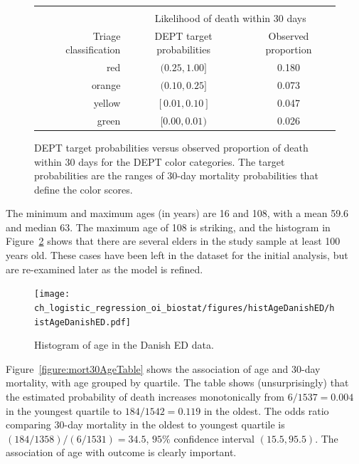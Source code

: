 \begin{figure}[ht]
\centering
\begin{tabular}{rcc}
  \hline \\
  & \multicolumn{2}{c}{Likelihood of death within 30 days} \\
Triage classification & DEPT target probabilities & Observed proportion  \\
  \hline
red & $(0.25, 1.00]$ & 0.180   \\
orange & $(0.10, 0.25]$ & 0.073   \\
yellow & $[0.01, 0.10]$ & 0.047   \\
green & $[0.00, 0.01)$ & 0.026   \\
   \hline
\end{tabular}
\caption{DEPT target probabilities  versus observed proportion of death within 30 days for the DEPT color categories. The target probabilities are the ranges of 30-day mortality probabilities that define the color scores.} 
\label{figure:predVsObsTriageMort30Table}
\end{figure}

The minimum and maximum ages (in years) are 16 and 108, with a mean 59.6 and median 63.  The maximum age of 108 is striking, and the histogram in Figure~\ref{figure:histAgeDanishED} shows that there are several elders in the study sample at least 100  years old.  These cases have been left in the dataset for the initial analysis, but are re-examined later as the model is refined.

\begin{figure}[!tbh]
  \centering
  \texttt{[image: ch\_logistic\_regression\_oi\_biostat/figures/histAgeDanishED/histAgeDanishED.pdf]}
    \caption{Histogram of age in the Danish ED data.}
    \label{figure:histAgeDanishED}
\end{figure}

Figure~\ref{figure:mort30AgeTable} shows the association of age and 30-day mortality, with age grouped by quartile. The table shows (unsurprisingly) that the estimated probability of death increases monotonically from $6/1537 = 0.004$ in the youngest quartile to $184/1542 = 0.119$ in the oldest.  The odds ratio comparing 30-day mortality in the oldest to youngest quartile  is $(184/1358)/(6/1531) = 34.5$, $95\%$ confidence interval $(15.5, 95.5)$.  The association of age with outcome is clearly important.

